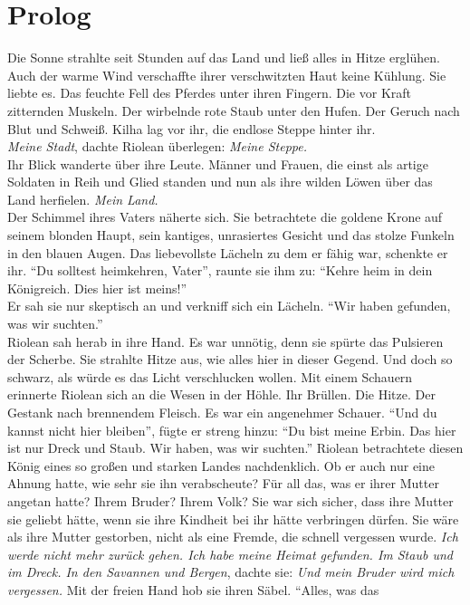 \chapter{Prolog}

Die Sonne strahlte seit Stunden auf das Land und ließ alles in Hitze erglühen. Auch der warme Wind 
verschaffte ihrer verschwitzten Haut keine Kühlung. Sie liebte es. Das feuchte Fell des Pferdes 
unter ihren Fingern. Die vor Kraft zitternden Muskeln. Der wirbelnde rote Staub unter den Hufen. 
Der Geruch nach Blut und Schweiß. Kilha lag vor ihr, die endlose Steppe hinter ihr.\\
\textit{Meine Stadt}, dachte Riolean überlegen: \textit{Meine Steppe.}\\
Ihr Blick wanderte über ihre Leute. Männer und Frauen, die einst als artige Soldaten in Reih und 
Glied standen und nun als ihre wilden Löwen über das Land herfielen. \textit{Mein Land.}\\
Der Schimmel ihres Vaters näherte sich. Sie betrachtete die goldene Krone auf seinem blonden Haupt, 
sein kantiges, unrasiertes Gesicht und das stolze Funkeln in den blauen Augen. Das liebevollste 
Lächeln zu dem er fähig war, schenkte er ihr. ``Du solltest heimkehren, Vater'', raunte sie ihm zu: 
``Kehre heim in dein Königreich. Dies hier ist meins!''\\
Er sah sie nur skeptisch an und verkniff sich ein Lächeln. ``Wir haben gefunden, was wir 
suchten.''\\
Riolean sah herab in ihre Hand. Es war unnötig, denn sie spürte das Pulsieren der Scherbe. Sie 
strahlte Hitze aus, wie alles hier in dieser Gegend. Und doch so schwarz, als würde es das Licht 
verschlucken wollen. Mit einem Schauern erinnerte Riolean sich an die Wesen in der Höhle. Ihr 
Brüllen. Die Hitze. Der Gestank nach brennendem Fleisch. Es war ein angenehmer Schauer. ``Und du 
kannst nicht hier bleiben'', fügte er streng hinzu: ``Du bist meine Erbin. Das hier ist nur Dreck 
und Staub. Wir haben, was wir suchten.''
Riolean betrachtete diesen König eines so großen und starken Landes nachdenklich. Ob er auch nur 
eine Ahnung hatte, wie sehr sie ihn verabscheute? Für all das, was er ihrer Mutter angetan 
hatte? Ihrem Bruder? Ihrem Volk? Sie war sich sicher, dass ihre Mutter sie geliebt hätte, wenn 
sie ihre Kindheit bei ihr hätte verbringen dürfen. Sie wäre als ihre Mutter gestorben, nicht als 
eine Fremde, die schnell vergessen wurde. \textit{Ich werde nicht mehr zurück gehen. Ich habe 
meine Heimat gefunden. Im Staub und im Dreck. In den Savannen und Bergen}, dachte sie: \textit{Und 
mein Bruder wird mich vergessen.} Mit der freien Hand hob sie ihren Säbel. ``Alles, was das 
